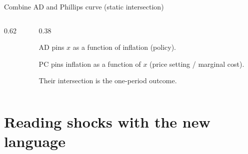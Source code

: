 \documentclass[aspectratio=169,xcolor=dvipsnames]{beamer}
\let\tempone\itemize
\let\temptwo\enditemize
\renewenvironment{itemize}{\tempone\addtolength{\itemsep}{\fill}}{\temptwo}
\begin{document}
\begin{frame}{Combine AD and Phillips curve (static intersection)}
\begin{columns}
\begin{column}{0.62\textwidth}
\centering
{}
\end{column}
\begin{column}{0.38\textwidth}
\small
\begin{itemize}
\item AD pins $x$ as a function of inflation (policy).
\item PC pins inflation as a function of $x$ (price setting / marginal cost).
\item Their intersection is the one-period outcome.
\end{itemize}
\end{column}
\end{columns}
\end{frame}

\section{Reading shocks with the new language}
\end{document}
